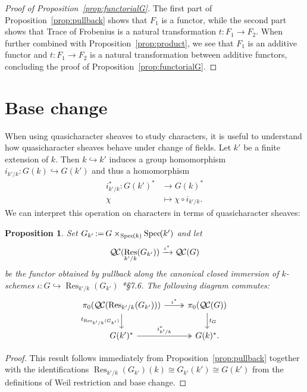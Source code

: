 \documentclass{amsart}
\theoremstyle{plain}
\newtheorem{proposition}[theorem]{Proposition}
\theoremstyle{definition}
\theoremstyle{remark}
\DeclareMathOperator{\Res}{Res}
\newcommand{\Spec}[1]{{\operatorname{Spec}\hskip-1pt( #1 )}}
\newcommand{\ceq}{{\, :=\, }}
\newcommand{\QC}{{\mathcal{Q\hskip-0.8pt C}}}
\newcommand{\QCiso}[1]{\pi_0 (\QC(#1))}
\newcommand{\trFrob}[1]{t_{#1}}
\begin{document}
\begin{proof}[Proof of Proposition~\ref{prop:functorialG}]
The first part of Proposition~\ref{prop:pullback} shows that $F_1$ is a functor,
while the second part shows that Trace of Frobenius is a natural transformation
$t: F_1 \to F_2$. When further combined with Proposition~\ref{prop:product},
we see that $F_1$ is an additive functor and $t: F_1 \to F_2$ is a natural
transformation between additive functors, 
concluding the proof of Proposition~\ref{prop:functorialG}.
\end{proof}

\section{Base change}\label{sec:basechange}

When using quasicharacter sheaves to study characters, it is useful to understand
how quasicharacter sheaves behave under change of fields.
Let $k'$ be a finite extension of $k$. Then $k \hookrightarrow k'$ induces a group homomorphism
$i_{k'/k} : G(k) \hookrightarrow G(k')$ and thus a homomorphism
\begin{align*}
i_{k'/k}^* : G(k')^* &\to G(k)^* \\
\chi &\mapsto \chi\circ i_{k'/k}.
\end{align*}
We can interpret this operation on characters in terms of quasicharacter sheaves:

\begin{proposition} \label{prop:csbe}
Set $G_{k'} \ceq G\times_\Spec{k} \Spec{k'}$ and let
\[
\QC(\Res_{k'/k}(G_{k'})) \xrightarrow{\iota^*} \QC(G)
\]
be the functor obtained by pullback along the canonical closed immersion of $k$-schemes
$\iota : G \hookrightarrow \Res_{k'/k}(G_{k'})$
\cite{bosch-lutkebohmert-reynaud:NeronModels}*{\S 7.6}. 
The following diagram commutes:
\[
\begin{tikzcd}
\QCiso{\Res_{k'/k}(G_{k'})} \arrow[two heads]{r}{\iota^*} \dar[swap]{\trFrob{\Res_{k'/k}(G_{k'})}} & \QCiso{G} \dar{\trFrob{G}} \\
G(k')^* \arrow[two heads]{r}{i_{k'/k}^*} & G(k)^*.
\end{tikzcd}
\]
\end{proposition}
\begin{proof}
This result follows immediately from Proposition~\ref{prop:pullback} together with the identifications
$\Res_{k'/k}(G_{k'})(k) \cong G_{k'}(k') \cong G(k')$ from the definitions of Weil restriction and base change.
\end{proof}
\end{document}
